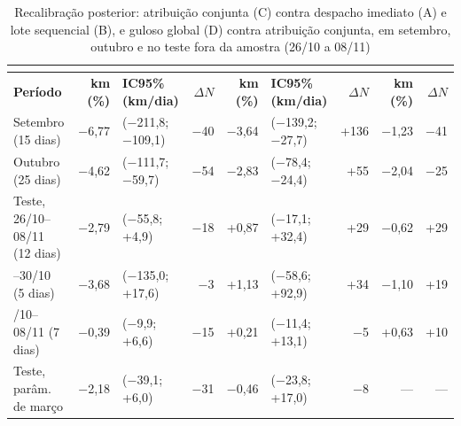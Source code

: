 \begin{table}[!htb]
\caption{Recalibração posterior: atribuição conjunta (C) contra despacho imediato (A) e lote sequencial (B), e guloso global (D) contra atribuição conjunta, em setembro, outubro e no teste fora da amostra (26/10 a 08/11)}\label{tab:r5}
\centering\fontetabela\setlength{\tabcolsep}{2pt}
\begin{tabular}{|>{\raggedright\arraybackslash}p{31mm}|r|l|r|r|l|r|r|r|}
\hline
 &  &  &  \\
\hline
\textbf{Período} & \textbf{km (\%)} & \textbf{IC95\% (km/dia)} & \textbf{$\Delta N$} & \textbf{km (\%)} & \textbf{IC95\% (km/dia)} & \textbf{$\Delta N$} & \textbf{km (\%)} & \textbf{$\Delta N$} \\
\hline
Setembro (15 dias) & −6,77 & (−211,8; −109,1) & −40 & −3,64 & (−139,2; −27,7) & +136 & −1,23 & −41 \\
\hline
Outubro (25 dias) & −4,62 & (−111,7; −59,7) & −54 & −2,83 & (−78,4; −24,4) & +55 & −2,04 & −25 \\
\hline
Teste, 26/10--08/11 (12 dias) & −2,79 & (−55,8; +4,9) & −18 & +0,87 & (−17,1; +32,4) & +29 & −0,62 & +29 \\
\hline
{}--30/10 (5 dias) & −3,68 & (−135,0; +17,6) & −3 & +1,13 & (−58,6; +92,9) & +34 & −1,10 & +19 \\
\hline
{}/10--08/11 (7 dias) & −0,39 & (−9,9; +6,6) & −15 & +0,21 & (−11,4; +13,1) & −5 & +0,63 & +10 \\
\hline
Teste, parâm. de março & −2,18 & (−39,1; +6,0) & −31 & −0,46 & (−23,8; +17,0) & −8 & --- & --- \\
\hline
\end{tabular}
\end{table}

